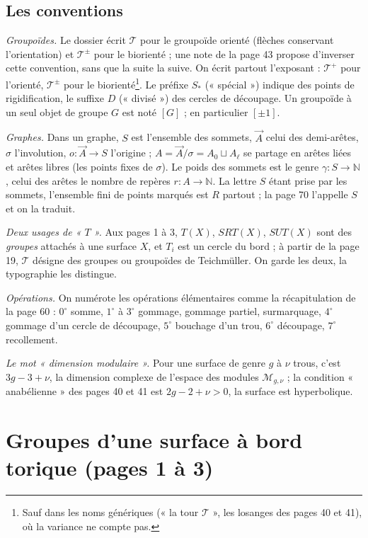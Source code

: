 \documentclass[11pt,a4paper]{article}
\begin{document}
\subsection*{Les conventions}

\emph{Groupoïdes.} Le dossier écrit $\mathcal{T}$ pour le groupoïde orienté
(flèches conservant l'orientation) et $\mathcal{T}^{\pm}$ pour le biorienté ;
une note de la page 43 propose d'inverser cette convention, sans que la suite
la suive. On écrit partout l'exposant : $\mathcal{T}^{+}$ pour l'orienté,
$\mathcal{T}^{\pm}$ pour le biorienté\footnote{Sauf dans les noms génériques
(« la tour $\mathcal{T}$ », les losanges des pages 40 et 41), où la variance
ne compte pas.}. Le préfixe $S_{*}$ (« spécial ») indique des points de
rigidification, le suffixe $D$ (« divisé ») des cercles de découpage. Un
groupoïde à un seul objet de groupe $G$ est noté $[G]$ ; en particulier
$[\pm 1]$.

\emph{Graphes.} Dans un graphe, $S$ est l'ensemble des sommets, $\vec{A}$
celui des demi-arêtes, $\sigma$ l'involution, $o : \vec{A} \to S$ l'origine ;
$A = \vec{A}/\sigma = A_0 \sqcup A_\ell$ se partage en arêtes liées et arêtes
libres (les points fixes de $\sigma$). Le poids des sommets est le genre
$\gamma : S \to \mathbb{N}$, celui des arêtes le nombre de repères
$r : A \to \mathbb{N}$. La lettre $S$ étant prise par les sommets, l'ensemble
fini de points marqués est $R$ partout ; la page 70 l'appelle $S$ et on la
traduit.

\emph{Deux usages de « $T$ ».} Aux pages 1 à 3, $T(X)$, $SRT(X)$, $SUT(X)$ sont
des \emph{groupes} attachés à une surface $X$, et $T_i$ est un cercle du bord ;
à partir de la page 19, $\mathcal{T}$ désigne des groupes ou groupoïdes de
Teichmüller. On garde les deux, la typographie les distingue.

\emph{Opérations.} On numérote les opérations élémentaires comme la
récapitulation de la page 60 : $0^\circ$ somme, $1^\circ$ à $3^\circ$
gommage, gommage partiel, surmarquage, $4^\circ$ gommage d'un cercle de
découpage, $5^\circ$ bouchage d'un trou, $6^\circ$ découpage, $7^\circ$
recollement.

\emph{Le mot « dimension modulaire ».} Pour une surface de genre $g$ à $\nu$
trous, c'est $3g - 3 + \nu$, la dimension complexe de l'espace des modules
$\mathcal{M}_{g,\nu}$ ; la condition « anabélienne » des pages 40 et 41 est
$2g - 2 + \nu > 0$, la surface est hyperbolique.

\section*{Groupes d'une surface à bord torique (pages 1 à 3)}
\end{document}
